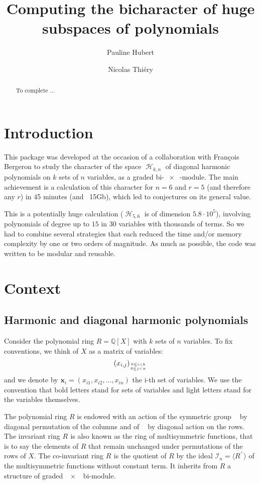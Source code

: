 \documentclass[letter,12pt]{article}
\title{Computing the bicharacter of huge subspaces of polynomials}
\author{Pauline Hubert \and Nicolas Thiéry}
\newcommand{\pauline}[1]{\todo[linecolor=blue,backgroundcolor=blue!25,bordercolor=blue]{#1}}
\newcommand{\QQ}{\mathbb{Q}}
\DeclareMathOperator{\Sn}{\mathbb{S}_n}
\DeclareMathOperator{\GLr}{GL_r}
\DeclareMathOperator{\harmonics}{\mathcal{H}}
\begin{document}
	
	\maketitle 
	
	\begin{abstract}
		To complete ... 
	\end{abstract}
	
	\tableofcontents

	
	\section{Introduction}
	This package was developed at the occasion of a collaboration with François Bergeron to study the character of the space $\harmonics_{k,n}$ of diagonal harmonic polynomials on $k$ sets of $n$ variables, as a graded bi-$\GLr \times \Sn$-module. The main achievement is a calculation of this character for $n=6$ \pauline{+ some cases for $n=7$} and $r=5$ (and therefore any $r$) in 45 minutes (and ~15Gb), which led to conjectures on its general value.
	
	This is a potentially huge calculation ($\harmonics_{5,6}$ is of dimension $5.8 \cdot10^5$), involving polynomials of degree up to $15$ in $30$ variables with thousands of terms. So we had to combine several strategies that each reduced the time and/or memory complexity by one or two orders of magnitude. As much as possible, the code was written to be modular and reusable.
	
	\section{Context}
	
	\subsection{Harmonic and diagonal harmonic polynomials}
		
	Consider the polynomial ring $R=\QQ[X]$ with $k$ sets of $n$ variables. To fix conventions, we think of $X$ as a matrix of variables:
	$$(x_{i,j})_{0\leq i<k \atop 0\leq j<n}$$
	and we denote by $\bm{x}_i = (x_{i1}, x_{i2}, \dots, x_{in})$ the i-th set of variables. We use the convention that bold letters stand for sets of variables and light letters stand for the variables themselves. 
	
	The polynomial ring $R$ is endowed with an action of the symmetric group $\Sn$ by diagonal permutation of the columns and of $\GLr$ by diagonal action on the rows. The invariant ring $R^{\Sn}$ is also known as the ring of multisymmetric functions, that is to say the elements of $R$ that remain unchanged under permutations of the rows of $X$. The co-invariant ring $R_{\Sn}$ is the quotient of $R$ by the ideal $\mathcal{I}_n = \langle {R^{\Sn^+}} \rangle$ of the multisymmetric functions without constant term. It inherits from $R$ a structure of graded $\GLr \times \Sn$ bi-module.
	
\end{document}
